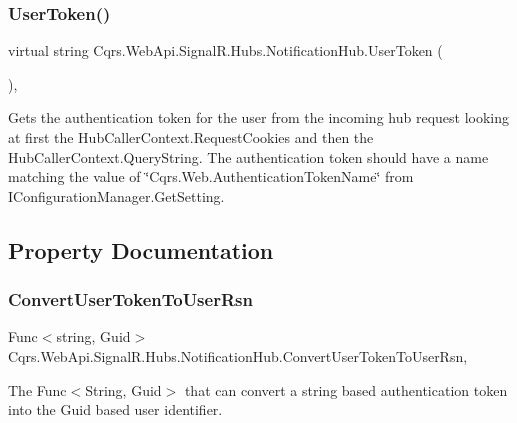 \subsubsection{\texorpdfstring{User\+Token()}{UserToken()}}
{\footnotesize\ttfamily virtual string Cqrs.\+Web\+Api.\+Signal\+R.\+Hubs.\+Notification\+Hub.\+User\+Token (\begin{DoxyParamCaption}{ }\end{DoxyParamCaption})\hspace{0.3cm}{\ttfamily [protected]}, {\ttfamily [virtual]}}



Gets the authentication token for the user from the incoming hub request looking at first the Hub\+Caller\+Context.\+Request\+Cookies and then the Hub\+Caller\+Context.\+Query\+String. The authentication token should have a name matching the value of \char`\"{}\+Cqrs.\+Web.\+Authentication\+Token\+Name\char`\"{} from I\+Configuration\+Manager.\+Get\+Setting. 



\subsection{Property Documentation}
\mbox{\label{classCqrs_1_1WebApi_1_1SignalR_1_1Hubs_1_1NotificationHub_a255a9ddc4f274cab0eae62e827f3726a_a255a9ddc4f274cab0eae62e827f3726a}} 
\subsubsection{\texorpdfstring{Convert\+User\+Token\+To\+User\+Rsn}{ConvertUserTokenToUserRsn}}
{\footnotesize\ttfamily Func$<$string, Guid$>$ Cqrs.\+Web\+Api.\+Signal\+R.\+Hubs.\+Notification\+Hub.\+Convert\+User\+Token\+To\+User\+Rsn\hspace{0.3cm}{\ttfamily [get]}, {\ttfamily [set]}}



The Func$<$\+String, Guid$>$ that can convert a string based authentication token into the Guid based user identifier. 


